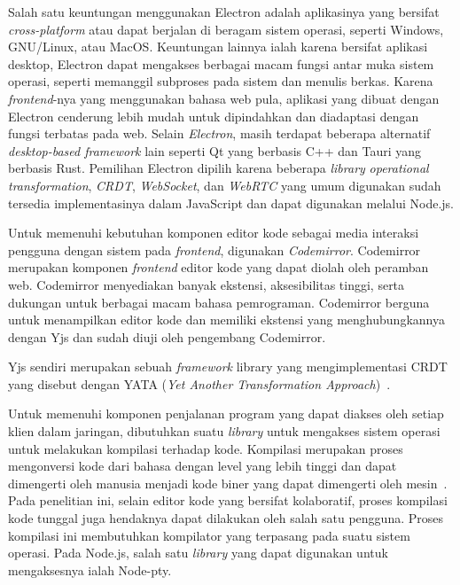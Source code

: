 Salah satu keuntungan menggunakan Electron adalah aplikasinya yang bersifat \textit{cross-platform} atau dapat berjalan di beragam sistem operasi, seperti Windows, GNU/Linux, atau MacOS. Keuntungan lainnya ialah karena bersifat aplikasi desktop, Electron dapat mengakses berbagai macam fungsi antar muka sistem operasi, seperti memanggil subproses pada sistem dan menulis berkas. Karena \textit{frontend}-nya yang menggunakan bahasa web pula, aplikasi yang dibuat dengan Electron cenderung lebih mudah untuk dipindahkan dan diadaptasi dengan fungsi terbatas pada web. Selain \textit{Electron}, masih terdapat beberapa alternatif \textit{desktop-based framework} lain seperti Qt yang berbasis C++ dan Tauri yang berbasis Rust. Pemilihan Electron dipilih karena beberapa \textit{library} \textit{operational transformation}, \textit{CRDT}, \textit{WebSocket}, dan \textit{WebRTC} yang umum digunakan sudah tersedia implementasinya dalam JavaScript dan dapat digunakan melalui Node.js.

Untuk memenuhi kebutuhan komponen editor kode sebagai media interaksi pengguna dengan sistem pada \textit{frontend}, digunakan \textit{Codemirror}. Codemirror merupakan komponen \textit{frontend} editor kode yang dapat diolah oleh peramban web. Codemirror menyediakan banyak ekstensi, aksesibilitas tinggi, serta dukungan untuk berbagai macam bahasa pemrograman. Codemirror berguna untuk menampilkan editor kode dan memiliki ekstensi yang menghubungkannya dengan Yjs dan sudah diuji oleh pengembang Codemirror.

Yjs sendiri merupakan sebuah \textit{framework} library yang mengimplementasi CRDT yang disebut dengan YATA (\textit{Yet Another Transformation Approach})~\citep{Nicolaescu2016yjs}.


Untuk memenuhi komponen penjalanan program yang dapat diakses oleh setiap klien dalam jaringan, dibutuhkan suatu \textit{library} untuk mengakses sistem operasi untuk melakukan kompilasi terhadap kode. Kompilasi merupakan proses mengonversi kode dari bahasa dengan level yang lebih tinggi dan dapat dimengerti oleh manusia menjadi kode biner yang dapat dimengerti oleh mesin~\citep{aho1985compilers}. Pada penelitian ini, selain editor kode yang bersifat kolaboratif, proses kompilasi kode tunggal juga hendaknya dapat dilakukan oleh salah satu pengguna. Proses kompilasi ini membutuhkan kompilator yang terpasang pada suatu sistem operasi. Pada Node.js, salah satu \textit{library} yang dapat digunakan untuk mengaksesnya ialah Node-pty.

